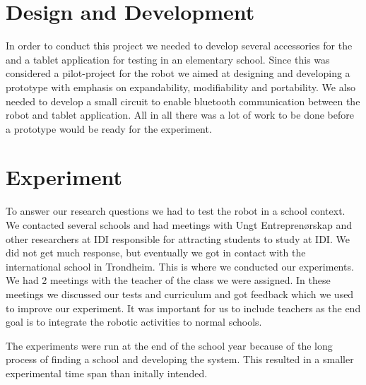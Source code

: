 \section{Design and Development}
In order to conduct this project we needed to develop several accessories for the \chirp and a tablet application for testing in an elementary school. 
Since this was considered a pilot-project for the \chirp robot we aimed at designing and developing a prototype with emphasis on expandability, modifiability and portability. 
We also needed to develop a small circuit to enable bluetooth communication between the robot and tablet application. 
All in all there was a lot of work to be done before a prototype would be ready for the experiment. 



\section{Experiment}
To answer our research questions we had to test the robot in a school context. We contacted several schools and had meetings with Ungt Entreprenørskap and other researchers at IDI responsible for attracting students to study at IDI. We did not get much response, but eventually we got in contact with the international school in Trondheim. This is where we conducted our experiments. We had 2 meetings with the teacher of the class we were assigned. In these meetings we discussed our tests and curriculum and got feedback which we used to improve our experiment. It was important for us to include teachers as the end goal is to integrate the robotic activities to normal schools.

\bigskip\noindent
The experiments were run at the end of the school year because of the long process of finding a school and developing the system. This resulted in a smaller experimental time span than initally intended.


